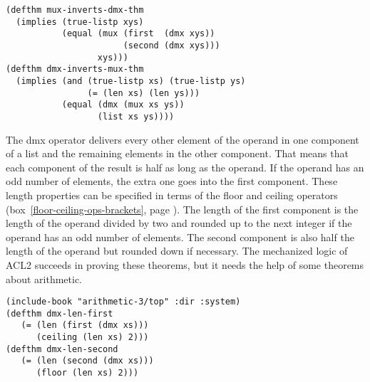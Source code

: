 \label{thm:mux-inverts-dmx}\label{thm:dmx-inverts-mux}
\begin{code}
\begin{verbatim}
(defthm mux-inverts-dmx-thm
  (implies (true-listp xys)
           (equal (mux (first  (dmx xys))
                       (second (dmx xys)))
                  xys)))
(defthm dmx-inverts-mux-thm
  (implies (and (true-listp xs) (true-listp ys)
                (= (len xs) (len ys)))
           (equal (dmx (mux xs ys))
                  (list xs ys))))
\end{verbatim}
\end{code}

The \textsf{dmx} operator delivers every other element of the operand in
one component of a list and the remaining elements in the other component.
That means that each component of the result is half as long as the operand.
If the operand has an odd number of elements, the extra one goes into the first component.
These length properties can be specified in terms of the \textsf{floor} and \textsf{ceiling}
operators (box~\ref{floor-ceiling-ops-brackets}, page \pageref{floor-ceiling-ops-brackets}).
The length of the first component is the length of the operand divided by two
and rounded up to the next integer if the operand has an odd number of elements.
The second component is also half the length of the operand but rounded down if necessary.
The mechanized logic of ACL2 succeeds in proving these theorems,
but it needs the help of some theorems about arithmetic.

\label{thm:dmx-length-first-second}
\begin{code}
\begin{verbatim}
(include-book "arithmetic-3/top" :dir :system)
(defthm dmx-len-first
   (= (len (first (dmx xs)))
      (ceiling (len xs) 2)))
(defthm dmx-len-second
   (= (len (second (dmx xs)))
      (floor (len xs) 2)))
\end{verbatim}
\end{code}

